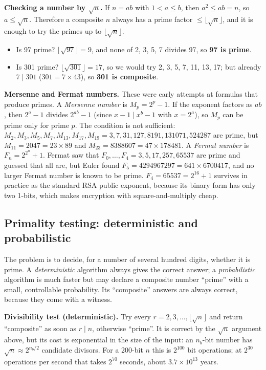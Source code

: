 \textbf{Checking a number by $\sqrt n$.} If $n = ab$ with $1 < a \le b$, then $a^2 \le ab = n$, so $a \le \sqrt n$. Therefore a composite $n$ always has a prime factor $\le \lfloor \sqrt n \rfloor$, and it is enough to try the primes up to $\lfloor\sqrt n\rfloor$.
\begin{itemize}
  \item Is 97 prime? $\lfloor\sqrt{97}\rfloor = 9$, and none of 2, 3, 5, 7 divides 97, so \textbf{97 is prime}.
  \item Is 301 prime? $\lfloor\sqrt{301}\rfloor = 17$, so we would try 2, 3, 5, 7, 11, 13, 17; but already $7 \mid 301$ ($301 = 7 \times 43$), so \textbf{301 is composite}.
\end{itemize}

\textbf{Mersenne and Fermat numbers.} These were early attempts at formulas that produce primes. A \emph{Mersenne number} is $M_p = 2^p - 1$. If the exponent factors as $ab$, then $2^a - 1$ divides $2^{ab} - 1$ (since $x - 1 \mid x^b - 1$ with $x = 2^a$), so $M_p$ can be prime only for prime $p$. The condition is not sufficient: $M_2, M_3, M_5, M_7, M_{13}, M_{17}, M_{19} = 3, 7, 31, 127, 8191, 131071, 524287$ are prime, but $M_{11} = 2047 = 23 \times 89$ and $M_{23} = 8388607 = 47 \times 178481$. A \emph{Fermat number} is $F_n = 2^{2^n} + 1$. Fermat saw that $F_0, \dots, F_4 = 3, 5, 17, 257, 65537$ are prime and guessed that all are, but Euler found $F_5 = 4294967297 = 641 \times 6700417$, and no larger Fermat number is known to be prime. $F_4 = 65537 = 2^{16} + 1$ survives in practice as the standard RSA public exponent, because its binary form has only two 1-bits, which makes encryption with square-and-multiply cheap.

\subsection{Primality testing: deterministic and probabilistic}
The problem is to decide, for a number of several hundred digits, whether it is prime. A \emph{deterministic} algorithm always gives the correct answer; a \emph{probabilistic} algorithm is much faster but may declare a composite number ``prime'' with a small, controllable probability. Its ``composite'' answers are always correct, because they come with a witness.

\textbf{Divisibility test (deterministic).} Try every $r = 2, 3, \dots, \lfloor\sqrt n\rfloor$ and return ``composite'' as soon as $r \mid n$, otherwise ``prime''. It is correct by the $\sqrt n$ argument above, but its cost is exponential in the size of the input: an $n_b$-bit number has $\sqrt n \approx 2^{n_b/2}$ candidate divisors. For a 200-bit $n$ this is $2^{100}$ bit operations; at $2^{30}$ operations per second that takes $2^{70}$ seconds, about $3.7 \times 10^{13}$ years.

